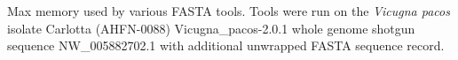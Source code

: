 Max memory used by various FASTA tools. Tools were run on the \textit{Vicugna pacos} isolate Carlotta (AHFN-0088) Vicugna_pacos-2.0.1 whole genome shotgun sequence NW_005882702.1 with additional unwrapped FASTA sequence record.
  